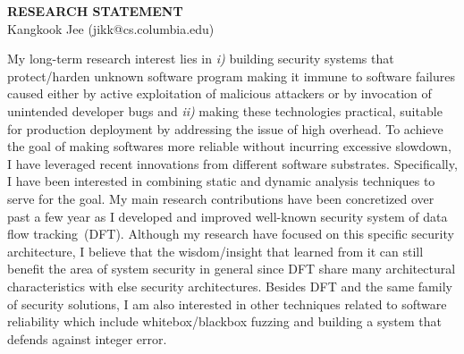 \documentclass[letterpaper, 10pt]{article}
\begin{document}
\begin{small}

\begin{center}
{\LARGE \bf RESEARCH STATEMENT}\\
\vspace*{0.1cm}
{\normalsize Kangkook Jee (jikk@cs.columbia.edu)}
\end{center}



My long-term research interest lies in {\it i)} building security systems that
protect/harden unknown software program making it immune to software failures
caused either by active exploitation of malicious attackers or by invocation of
unintended developer bugs and {\it ii)} making these technologies practical,
suitable for production deployment by addressing the issue of high overhead.
%
To achieve the goal of making softwares more reliable without incurring
excessive slowdown, I have leveraged recent innovations from different software
substrates. Specifically, I have been interested in combining static and
dynamic analysis techniques to serve for the goal.
%
My main research contributions have been concretized over past a few year as I
developed and improved well-known security system of data flow tracking~(DFT).
Although my research have focused on this specific security architecture, I
believe that the wisdom/insight that learned from it can still benefit the area
of system security in general since DFT share many architectural
characteristics with else security architectures.
%
Besides DFT and the same family of security solutions, I am also interested in
other techniques related to software reliability which include
whitebox/blackbox fuzzing and building a system that defends against integer
error.


\end{small}
\end{document}
